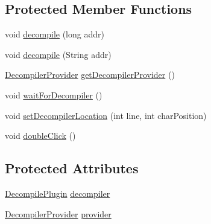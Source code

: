 \subsection*{Protected Member Functions}
\begin{DoxyCompactItemize}
\item 
void \mbox{\hyperlink{classghidra_1_1app_1_1plugin_1_1core_1_1decompile_1_1_abstract_decompiler_test_a9d26f26311f687312c38172ea301e048}{decompile}} (long addr)
\item 
void \mbox{\hyperlink{classghidra_1_1app_1_1plugin_1_1core_1_1decompile_1_1_abstract_decompiler_test_a3cf71446efa71e0a76b812ebffa38080}{decompile}} (String addr)
\item 
\mbox{\hyperlink{classghidra_1_1app_1_1plugin_1_1core_1_1decompile_1_1_decompiler_provider}{Decompiler\+Provider}} \mbox{\hyperlink{classghidra_1_1app_1_1plugin_1_1core_1_1decompile_1_1_abstract_decompiler_test_a3500d6885e44afbd2c17791b7cbef0fe}{get\+Decompiler\+Provider}} ()
\item 
void \mbox{\hyperlink{classghidra_1_1app_1_1plugin_1_1core_1_1decompile_1_1_abstract_decompiler_test_ab9c1e094ec0742fb4eede3b741d00987}{wait\+For\+Decompiler}} ()
\item 
void \mbox{\hyperlink{classghidra_1_1app_1_1plugin_1_1core_1_1decompile_1_1_abstract_decompiler_test_ab96f45f00a2a62697ba177bd42a608c6}{set\+Decompiler\+Location}} (int line, int char\+Position)
\item 
void \mbox{\hyperlink{classghidra_1_1app_1_1plugin_1_1core_1_1decompile_1_1_abstract_decompiler_test_a1063d5440b4632c1589366050d8395b5}{double\+Click}} ()
\end{DoxyCompactItemize}
\subsection*{Protected Attributes}
\begin{DoxyCompactItemize}
\item 
\mbox{\hyperlink{classghidra_1_1app_1_1plugin_1_1core_1_1decompile_1_1_decompile_plugin}{Decompile\+Plugin}} \mbox{\hyperlink{classghidra_1_1app_1_1plugin_1_1core_1_1decompile_1_1_abstract_decompiler_test_a010f6fcc038baad5ee92546adaaae87c}{decompiler}}
\item 
\mbox{\hyperlink{classghidra_1_1app_1_1plugin_1_1core_1_1decompile_1_1_decompiler_provider}{Decompiler\+Provider}} \mbox{\hyperlink{classghidra_1_1app_1_1plugin_1_1core_1_1decompile_1_1_abstract_decompiler_test_a5958a6cf8e136e45b59b1e6df0914d80}{provider}}
\end{DoxyCompactItemize}


